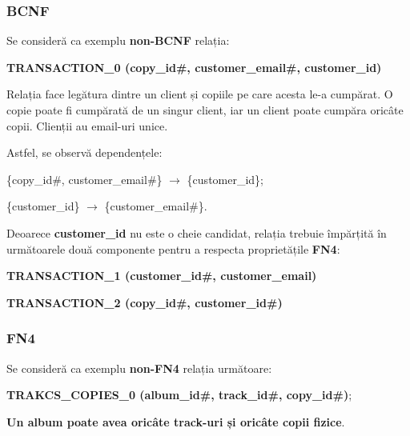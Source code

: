 \documentclass[a4paper, oneside, 12pt]{article}
\begin{document}
\subsubsection{\textbf{BCNF}}

Se consideră ca exemplu \textbf{non-BCNF} relația:

\begin{m_itemize}
        \item \textbf{TRANSACTION\_0 (copy\_id\#, customer\_email\#, customer\_id)}
\end{m_itemize}

Relația face legătura dintre un client și copiile pe care acesta le-a cumpărat. O copie poate fi cumpărată de un singur client, iar un client poate cumpăra oricâte copii. Clienții au email-uri unice.

Astfel, se observă dependențele:

\begin{m_itemize}
\item \{copy\_id\#, customer\_email\#\} $\rightarrow$ \{customer\_id\};
\item \{customer\_id\} $\rightarrow$ \{customer\_email\#\}.
\end{m_itemize}

Deoarece \textbf{customer\_id} nu este o cheie candidat, relația trebuie împărțită în următoarele două componente pentru a respecta proprietățile \textbf{FN4}:

\begin{m_itemize}
        \item \textbf{TRANSACTION\_1 (customer\_id\#, customer\_email)}
        \item \textbf{TRANSACTION\_2 (copy\_id\#, customer\_id\#)}
\end{m_itemize}

\subsubsection{\textbf{FN4}}

Se consideră ca exemplu \textbf{non-FN4} relația următoare:

\begin{m_itemize}[after=]
        \item \textbf{TRAKCS\_COPIES\_0 (album\_id\#, track\_id\#, copy\_id\#)};
        \item \textbf{Un album poate avea oricâte track-uri și oricâte copii fizice}.
\end{m_itemize}
\end{document}
